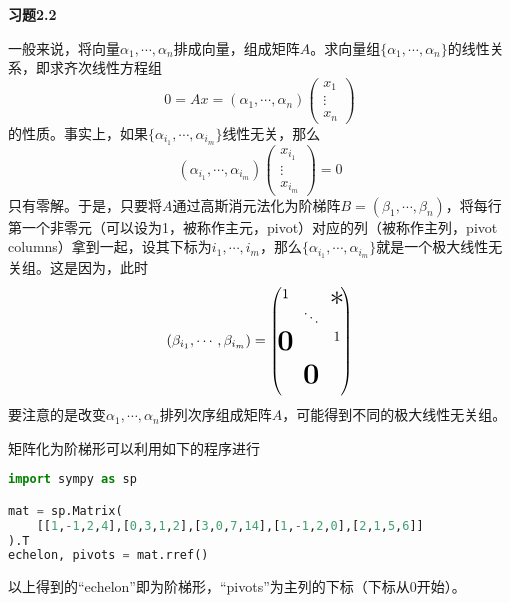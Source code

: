 \renewcommand{\newpageorvspace}{\vspace{2em}}

\date{第三次作业}



\maketitle

{\bf 习题2.2}

一般来说，将向量$\alpha_1,\cdots,\alpha_n$排成向量，组成矩阵$A$。求向量组$\{\alpha_1,\cdots,\alpha_n\}$的线性关系，即求齐次线性方程组
$$0 = Ax = (\alpha_1,\cdots,\alpha_n) \begin{pmatrix} x_{1} \\ \vdots \\ x_{n} \end{pmatrix}$$
的性质。事实上，如果$\{\alpha_{i_1},\cdots,\alpha_{i_m}\}$线性无关，那么
$$(\alpha_{i_1},\cdots,\alpha_{i_m}) \begin{pmatrix} x_{i_1} \\ \vdots \\ x_{i_m} \end{pmatrix} = 0$$
只有零解。于是，只要将$A$通过高斯消元法化为阶梯阵$B = (\beta_1,\cdots,\beta_n)$，将每行第一个非零元（可以设为1，被称作主元，pivot）对应的列（被称作主列，pivot columns）拿到一起，设其下标为$i_1,\cdots,i_m$，那么$\{\alpha_{i_1},\cdots,\alpha_{i_m}\}$就是一个极大线性无关组。这是因为，此时
$$(\beta_{i_1},\cdots,\beta_{i_m}) = \begin{pmatrix} 1 & & \makebox(0,0){\text{\huge $\ast$}} \\ & \ddots & \\ \makebox(0,0){\text{\huge\bf 0}} & & 1 \\ & & \\ & \makebox(0,0){\text{\huge\bf 0}} & \\ & & \end{pmatrix}$$
要注意的是改变$\alpha_1,\cdots,\alpha_n$排列次序组成矩阵$A$，可能得到不同的极大线性无关组。

矩阵化为阶梯形可以利用如下的程序进行
\begin{center}
\begin{lstlisting}[language=Python]
import sympy as sp

mat = sp.Matrix(
    [[1,-1,2,4],[0,3,1,2],[3,0,7,14],[1,-1,2,0],[2,1,5,6]]
).T
echelon, pivots = mat.rref()
\end{lstlisting}
\end{center}
以上得到的``echelon''即为阶梯形，``pivots''为主列的下标（下标从0开始）。

